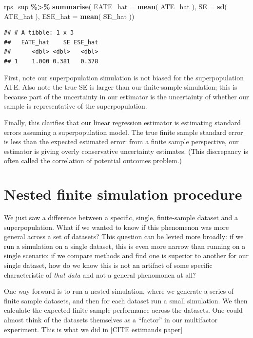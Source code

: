 \documentclass[
]{book}
\newenvironment{Shaded}{\begin{snugshade}}{\end{snugshade}}
\newcommand{\AttributeTok}[1]{\textcolor[rgb]{0.13,0.29,0.53}{#1}}
\newcommand{\FunctionTok}[1]{\textcolor[rgb]{0.13,0.29,0.53}{\textbf{#1}}}
\newcommand{\NormalTok}[1]{#1}
\newcommand{\SpecialCharTok}[1]{\textcolor[rgb]{0.81,0.36,0.00}{\textbf{#1}}}
\begin{document}
\begin{Shaded}
\begin{Highlighting}[]
\NormalTok{rps\_sup }\SpecialCharTok{\%\textgreater{}\%} \FunctionTok{summarise}\NormalTok{( }\AttributeTok{EATE\_hat =} \FunctionTok{mean}\NormalTok{( ATE\_hat ),}
                   \AttributeTok{SE =} \FunctionTok{sd}\NormalTok{( ATE\_hat ),}
                   \AttributeTok{ESE\_hat =} \FunctionTok{mean}\NormalTok{( SE\_hat ))}
\end{Highlighting}
\end{Shaded}

\begin{verbatim}
## # A tibble: 1 x 3
##   EATE_hat    SE ESE_hat
##      <dbl> <dbl>   <dbl>
## 1    1.000 0.381   0.378
\end{verbatim}

First, note our superpopulation simulation is not biased for the superpopulation ATE.
Also note the true SE is larger than our finite-sample simulation; this is because part of the uncertainty in our estimator is the uncertainty of whether our sample is representative of the superpopulation.

Finally, this clarifies that our linear regression estimator is estimating standard errors assuming a superpopulation model.
The true finite sample standard error is less than the expected estimated error: from a finite sample perspective, our estimator is giving overly conservative uncertainty estimates.
(This discrepancy is often called the correlation of potential outcomes problem.)

\section{Nested finite simulation procedure}\label{nested-finite-simulation-procedure}

We just saw a difference between a specific, single, finite-sample dataset and a superpopulation.
What if we wanted to know if this phenomenon was more general across a set of datasets?
This question can be levied more broadly: if we run a simulation on a single dataset, this is even more narrow than running on a single scenario: if we compare methods and find one is superior to another for our single dataset, how do we know this is not an artifact of some specific characteristic of \emph{that data} and not a general phenomonen at all?

One way forward is to run a nested simulation, where we generate a series of finite sample datasets, and then for each dataset run a small simulation.
We then calculate the expected finite sample performance across the datasets.
One could almost think of the datasets themselves as a ``factor'' in our multifactor experiment.
This is what we did in {[}CITE estimands paper{]}
\end{document}
